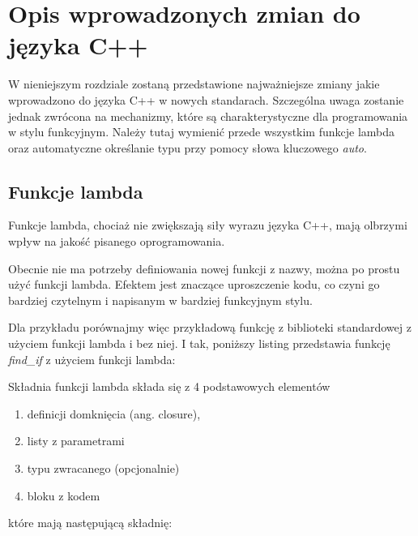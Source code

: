\documentclass{pracamgr}
\begin{document}
\chapter{Opis wprowadzonych zmian do języka C++}\label{r:Zmiany}

W nieniejszym rozdziale zostaną przedstawione najważniejsze zmiany jakie wprowadzono do języka C++ w nowych standarach. 
Szczególna uwaga zostanie jednak zwrócona na mechanizmy, które są charakterystyczne dla programowania w stylu funkcyjnym.
Należy tutaj wymienić przede wszystkim funkcje lambda oraz automatyczne określanie typu przy pomocy słowa kluczowego \textit{auto}.





\section{Funkcje lambda}

Funkcje lambda, chociaż nie zwiększają siły wyrazu języka C++, mają olbrzymi wpływ na jakość pisanego 
oprogramowania.

Obecnie nie ma potrzeby definiowania nowej funkcji z nazwy, można po prostu użyć funkcji lambda.
Efektem jest znaczące uproszczenie kodu, co czyni go bardziej czytelnym i napisanym w bardziej funkcyjnym stylu.
 
Dla przykładu porównajmy więc przykładową funkcję z biblioteki standardowej z użyciem funkcji lambda i bez niej.
I tak, poniższy listing przedstawia funkcję \textit{find\_if} z użyciem funkcji lambda: 


\noindent
Składnia funkcji lambda składa się z 4 podstawowych elementów
\begin{enumerate}
\item definicji domknięcia (ang. closure),
\item listy z parametrami
\item typu zwracanego (opcjonalnie)
\item bloku z kodem
\end{enumerate}

\noindent
które mają następującą składnię:
\end{document}
